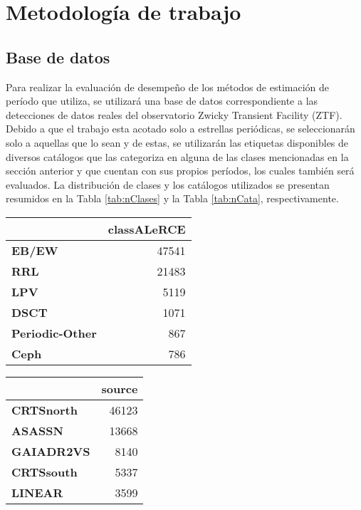 \newpage
\section{Metodología de trabajo}

    \subsection{Base de datos}
    
    Para realizar la evaluación de desempeño de los métodos de estimación de período que utiliza, se utilizará una base de datos correspondiente a las detecciones de datos reales del observatorio Zwicky Transient Facility (ZTF). Debido a que el trabajo esta acotado solo a estrellas periódicas, se seleccionarán solo a aquellas que lo sean y de estas, se utilizarán las etiquetas disponibles de diversos catálogos que las categoriza en alguna de las clases mencionadas en la sección anterior y que cuentan con sus propios períodos, los cuales también será evaluados. La distribución de clases y los catálogos utilizados se presentan resumidos en la Tabla \ref{tab:nClases} y la Tabla \ref{tab:nCata}, respectivamente.\\
    
    \begin{multicols}{2}
    \centering
        \begin{tabular}{lr}
        \toprule
        {} &  \textbf{classALeRCE} \\
        \midrule
        \textbf{EB/EW         } &        47541 \\
        \textbf{RRL           } &        21483 \\
        \textbf{LPV           } &         5119 \\
        \textbf{DSCT          } &         1071 \\
        \textbf{Periodic-Other} &          867 \\
        \textbf{Ceph          } &          786 \\
        \bottomrule
        \end{tabular}
        \label{tab:nClases}

    \centering
        \begin{tabular}{lr}
        \toprule
        {} &  \textbf{source} \\
        \midrule
        \textbf{CRTSnorth} &   46123 \\
        \textbf{ASASSN   } &   13668 \\
        \textbf{GAIADR2VS} &    8140 \\
        \textbf{CRTSsouth} &    5337 \\
        \textbf{LINEAR   } &    3599 \\
        \bottomrule
        \end{tabular}
        \label{tab:nCata}
    \end{multicols}
    
